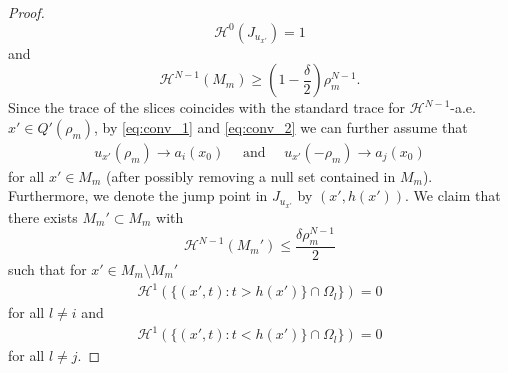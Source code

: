 \documentclass[a4paper, 11pt, reqno]{amsart}
\theoremstyle{plain}
\theoremstyle{definition}
\theoremstyle{remark}
\renewcommand{\H}{\mathcal H}
\begin{document}
\begin{proof}
    \[
        \H^0(J_{u_{x'}}) = 1
    \]
    and 
    \[
        \H^{N-1}(M_m) \geq \left(1 - \frac{\delta}{2} \right)\rho_m^{N-1}.
    \]
    Since the trace of the slices coincides with the standard trace for $\H^{N-1}$-a.e. $x' \in Q'(\rho_m)$, by \eqref{eq:conv_1} and \eqref{eq:conv_2} we can further assume that
    \begin{align*}
        u_{x'}(\rho_m) \to a_i(x_0) \quad \text{ and } \quad  u_{x'}(-\rho_m) \to a_j(x_0)
    \end{align*}
    for all $x' \in M_m$ (after possibly removing a null set contained in $M_m$). Furthermore, we denote the jump point in $J_{u_{x'}}$ by $(x', h(x'))$. We claim that there exists $M_m'\subset M_m$ with 
    $$\H^{N-1}(M_m') \leq \frac{\delta\rho_m^{N-1}}{2}$$ 
    such that for $x' \in M_m\setminus M_m'$ 
    \begin{align}\label{eq:cond_set_1}
        \H^1(\{ (x', t): t > h(x') \} \cap \Omega_l \}) = 0
    \end{align}
    for all $l \neq i$ and 
    \begin{align}\label{eq:cond_set_2}
        \H^1(\{ (x', t): t < h(x') \} \cap \Omega_l \}) = 0
    \end{align}
    for all $l \neq j$. 
    

\end{proof}
\end{document}
